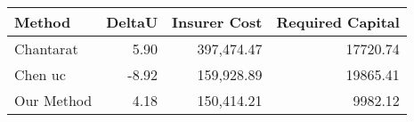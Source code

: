 \begin{tabular}{lrrr}
\toprule
Method & DeltaU & Insurer Cost & Required Capital \\
\midrule
Chantarat & 5.90 & 397,474.47 & 17720.74 \\
Chen uc & -8.92 & 159,928.89 & 19865.41 \\
Our Method & 4.18 & 150,414.21 & 9982.12 \\
\bottomrule
\end{tabular}
